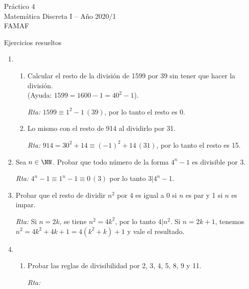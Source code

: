 \documentclass[12pt,spanish,makeidx]{amsbook}
\newcommand{\rta}{\noindent\textit{Rta: }}
\newcommand{\md}[1]{{\,}\left(#1\right)}
\begin{document}
{\bf \begin{center} Práctico 4 \\ Matemática Discreta I -- Año 2020/1 \\ FAMAF \end{center}}

{\bf \begin{center} Ejercicios resueltos \end{center}}

\begin{enumerate}
	\item  
	\begin{enumerate}
		\item Calcular el resto de la división de 1599 por 39 sin tener que hacer la división. \\(Ayuda: $1599=1600-1=40^2-1$).
		
		\rta $1599\equiv 1^2-1\md{ 39}$, por lo tanto el resto es 0.
		
		\item Lo mismo con el resto de 914 al dividirlo por 31.
		
		\rta $914=30^2+14\equiv (-1)^2+14 \md{ 31}$, por lo tanto el resto es 15.
	\end{enumerate}
	
	
	\smallskip
	\item Sea $n\in\NN$. Probar que todo número de la forma $4^n-1$ es divisible por 3.
	
	\rta $4^n-1\equiv 1^n-1 \equiv 0 \md 3$ por lo tanto $3\vert 4^n-1$.
	
	\smallskip
	\item Probar que el resto de dividir $n^2$ por 4 es igual a 0 si $n$ es par y 1 si $n$ es impar.
		
	\rta  Si $n=2k$, se tiene $n^2=4k^2$, por lo tanto $4\vert n^2$. Si $n=2k+1$, tenemos $n^2=4k^2+4k+1=4(k^2+k)+1$ y vale el resultado.
	
	
	
	\smallskip
	\item
	\begin{enumerate}
		\item
		Probar las reglas de divisibilidad por 2, 3, 4, 5, 8, 9 y 11.%
			
		\rta 
		

\end{enumerate}
\end{enumerate}
\end{document}
